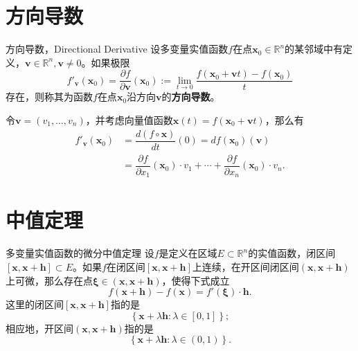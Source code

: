 
\section{方向导数}


\begin{frame}

\begin{block}{方向导数，Directional Derivative}
设多变量实值函数$f$在点$\mathbf{x}_0 \in \mathbb{R}^n$的某邻域中有定义，$\mathbf{v} \in \mathbb{R}^n, \mathbf{v} \neq 0$。如果极限
$$f'_{\mathbf{v}}(\mathbf{x}_0) = \dfrac{\partial f}{\partial \mathbf{v}}(\mathbf{x}_0) := \lim\limits_{t \to 0} \dfrac{f(\mathbf{x}_0 + \mathbf{v}t) - f(\mathbf{x}_0)}{t}$$
存在，则称其为函数$f$在点$\mathbf{x}_0$沿方向$\mathbf{v}$的{\bfseries 方向导数}。
\end{block}

\pause

令$\mathbf{v} = (v_1,\ldots,v_n)$，并考虑向量值函数$\mathbf{x}(t) = f(\mathbf{x}_0 + \mathbf{v}t)$，那么有
\begin{align*}
f'_{\mathbf{v}}(\mathbf{x}_0) & = \dfrac{d(f\circ \mathbf{x})}{dt}(0) = df(\mathbf{x}_0)(\mathbf{v})\\
& = \dfrac{\partial f}{\partial x_1}(\mathbf{x}_0) \cdot v_1 + \cdots + \dfrac{\partial f}{\partial x_n}(\mathbf{x}_0) \cdot v_n.
\end{align*}

\end{frame}


\section{中值定理}


\begin{frame}

\begin{block}{多变量实值函数的微分中值定理}
设$f$是定义在区域$E \subset \mathbb{R}^n$的实值函数，闭区间$[\mathbf{x}, \mathbf{x} + \mathbf{h}] \subset E$。如果$f$在闭区间$[\mathbf{x}, \mathbf{x} + \mathbf{h}]$上连续，在开区间闭区间$(\mathbf{x}, \mathbf{x} + \mathbf{h})$上可微，那么存在点$\mathbf{\xi} \in (\mathbf{x}, \mathbf{x} + \mathbf{h})$，使得下式成立
$$f(\mathbf{x} + \mathbf{h}) - f(\mathbf{x}) = f'(\mathbf{\xi})\cdot\mathbf{h}.$$
这里的闭区间$[\mathbf{x}, \mathbf{x} + \mathbf{h}]$指的是
$$\left\{ \mathbf{x} + \lambda \mathbf{h}: \lambda \in [0,1] \right\};$$
相应地，开区间$(\mathbf{x}, \mathbf{x} + \mathbf{h})$指的是
$$\left\{ \mathbf{x} + \lambda \mathbf{h}: \lambda \in (0,1) \right\}.$$
\end{block}

\end{frame}

